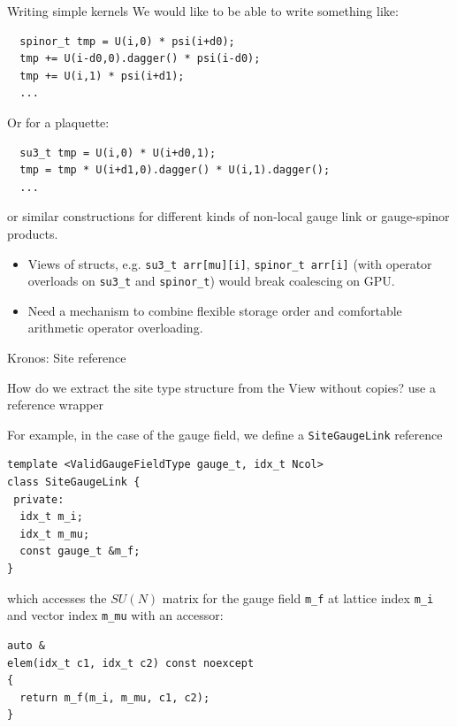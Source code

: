 \begin{frame}[fragile]{Writing simple kernels}
  We would like to be able to write something like:
  \begin{verbatim}
  spinor_t tmp = U(i,0) * psi(i+d0);
  tmp += U(i-d0,0).dagger() * psi(i-d0);
  tmp += U(i,1) * psi(i+d1);
  ...
  \end{verbatim}
  \vspace{-0.3cm}
  Or for a plaquette:
  \begin{verbatim}
  su3_t tmp = U(i,0) * U(i+d0,1);
  tmp = tmp * U(i+d1,0).dagger() * U(i,1).dagger();
  ...
  \end{verbatim}
  or similar constructions for different kinds of non-local gauge link or gauge-spinor products.

  \begin{itemize}
  \vspace{0.4cm}
  \item Views of structs, e.g. \texttt{su3_t arr[mu][i]}, \texttt{spinor_t arr[i]} (with operator overloads on \texttt{su3_t} and \texttt{spinor_t}) would break coalescing on GPU. 
  \vspace{0.3cm}
    \item Need a mechanism to combine flexible storage order and comfortable arithmetic operator overloading.
  \end{itemize}
\end{frame}

\begin{frame}[fragile]{Kronos: Site reference}
  
  \begin{bkalertblock}{How do we extract the site type structure from the View without copies?}
    use a reference wrapper
  \end{bkalertblock}

  For example, in the case of the gauge field, we define a
  \verb|SiteGaugeLink| reference

  \begin{verbatim}
template <ValidGaugeFieldType gauge_t, idx_t Ncol>
class SiteGaugeLink {
 private:
  idx_t m_i;
  idx_t m_mu;
  const gauge_t &m_f;
}
  \end{verbatim}
  which accesses the $SU(N)$ matrix for the gauge field \verb|m_f| at lattice index
  \verb|m_i| and vector index \verb|m_mu| with an accessor:
  \begin{verbatim}
auto &
elem(idx_t c1, idx_t c2) const noexcept
{
  return m_f(m_i, m_mu, c1, c2);
}
  \end{verbatim}

\end{frame}

